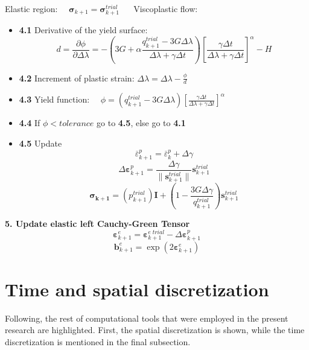 \documentclass[applsci,journal,article,submit,moreauthors,pdftex]{Definitions/mdpi}
\begin{document}
\begin{algorithm}
\begin{algorithmic}
 Elastic region: $\quad \boldsymbol{\sigma}_{k+1}=\boldsymbol{\sigma}^{trial}_{k+1}$
\vspace{0.3cm}
\ELSE    $\quad$  Viscoplastic flow:
\begin{itemize}
\item\textbf{4.1} Derivative of the yield surface:
\begin{equation}
d=\frac{\partial\phi}{\partial\Delta\lambda} = - \left( 3G  + \alpha \frac{q^{trial}_{k+1}  - 3G\Delta\lambda}{\Delta \lambda + \gamma\Delta t}\right) \left[  \frac{\gamma \Delta t}{\Delta \lambda+\gamma \Delta  t} \right]^{\alpha}  - H \nonumber
\end{equation}
\item\textbf{4.2} Increment of plastic strain:
$
\Delta\lambda=\Delta\lambda-\frac{\phi}{d}
$\vspace{0.3cm}
\item\textbf{4.3} Yield function:
$
\quad \phi= \left(q^{trial}_{k+1}  - 3G\Delta\lambda\right) \left[  \frac{\gamma \Delta t}{\Delta \lambda+\gamma \Delta  t} \right]^{\alpha} 
$\vspace{0.3cm}
\item\textbf{4.4} If $\phi < tolerance$ go to \textbf{4.5}, else go to  \textbf{4.1}
\item\textbf{4.5} Update
$$
\overline{\varepsilon}^p_{k+1}=\overline{\varepsilon}^p_{k}+\Delta\gamma
$$
$$
\Delta\boldsymbol{\varepsilon}_{k+1}^{p}= \frac{\Delta\gamma}{\|\textbf{s}^{trial}_{k+1}\|}\mathbf{s}^{trial}_{k+1}
$$
$$
\boldsymbol{\sigma_{k+1}}=\left(p^{trial}_{k+1} \right)\mathbf{I}+\left(1-\frac{3G\Delta\gamma}{q^{trial}_{k+1} }\right)\textbf{s}^{trial}_{k+1}
$$
\end{itemize}
\ENDIF\vspace{0.3cm}
%
\State \textbf{5. Update elastic left Cauchy-Green Tensor}
$$
\boldsymbol{\varepsilon}_{k+1}^{e}= \boldsymbol{\varepsilon}^{e\; trial}_{k+1}-\Delta\boldsymbol{\varepsilon}_{k+1}^{p}
$$
$$
\mathbf{b}_{k+1}^{e}=\exp (2 \boldsymbol{\varepsilon}_{k+1}^{e})
$$
\end{algorithmic}
\end{algorithm}

\section{Time and spatial discretization}
Following, the rest of computational tools that were employed in the present research are highlighted. First, the spatial discretization is shown, while the time discretization is mentioned in the final subsection.
\end{document}
